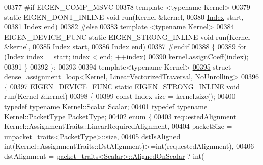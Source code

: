 \begin{DoxyCode}
00377 \textcolor{preprocessor}{#if EIGEN\_COMP\_MSVC}
00378   \textcolor{keyword}{template} <\textcolor{keyword}{typename} Kernel>
00379   \textcolor{keyword}{static} EIGEN\_DONT\_INLINE \textcolor{keywordtype}{void} run(Kernel &kernel,
00380                                     \hyperlink{namespace_eigen_a62e77e0933482dafde8fe197d9a2cfde}{Index} start,
00381                                     \hyperlink{namespace_eigen_a62e77e0933482dafde8fe197d9a2cfde}{Index} end)
00382 \textcolor{preprocessor}{#else}
00383   \textcolor{keyword}{template} <\textcolor{keyword}{typename} Kernel>
00384   EIGEN\_DEVICE\_FUNC \textcolor{keyword}{static} EIGEN\_STRONG\_INLINE \textcolor{keywordtype}{void} run(Kernel &kernel,
00385                                       \hyperlink{namespace_eigen_a62e77e0933482dafde8fe197d9a2cfde}{Index} start,
00386                                       \hyperlink{namespace_eigen_a62e77e0933482dafde8fe197d9a2cfde}{Index} end)
00387 \textcolor{preprocessor}{#endif}
00388   \{
00389     \textcolor{keywordflow}{for} (\hyperlink{namespace_eigen_a62e77e0933482dafde8fe197d9a2cfde}{Index} index = start; index < end; ++index)
00390       kernel.assignCoeff(index);
00391   \}
00392 \};
00393 
00394 \textcolor{keyword}{template}<\textcolor{keyword}{typename} Kernel>
\hyperlink{struct_eigen_1_1internal_1_1dense__assignment__loop_3_01_kernel_00_01_linear_vectorized_traversal_00_01_no_unrolling_01_4}{00395} \textcolor{keyword}{struct }\hyperlink{struct_eigen_1_1internal_1_1dense__assignment__loop}{dense\_assignment\_loop}<Kernel, LinearVectorizedTraversal, NoUnrolling>
00396 \{
00397   EIGEN\_DEVICE\_FUNC \textcolor{keyword}{static} EIGEN\_STRONG\_INLINE \textcolor{keywordtype}{void} run(Kernel &kernel)
00398   \{
00399     \textcolor{keyword}{const} \hyperlink{namespace_eigen_a62e77e0933482dafde8fe197d9a2cfde}{Index} size = kernel.size();
00400     \textcolor{keyword}{typedef} \textcolor{keyword}{typename} Kernel::Scalar Scalar;
00401     \textcolor{keyword}{typedef} \textcolor{keyword}{typename} Kernel::PacketType \hyperlink{struct_eigen_1_1_packet_type}{PacketType};
00402     \textcolor{keyword}{enum} \{
00403       requestedAlignment = Kernel::AssignmentTraits::LinearRequiredAlignment,
00404       packetSize = \hyperlink{struct_eigen_1_1internal_1_1unpacket__traits}{unpacket\_traits<PacketType>::size},
00405       dstIsAligned = int(Kernel::AssignmentTraits::DstAlignment)>=int(requestedAlignment),
00406       dstAlignment = \hyperlink{struct_eigen_1_1internal_1_1packet__traits}{packet\_traits<Scalar>::AlignedOnScalar} ? int(

\end{DoxyCode}
